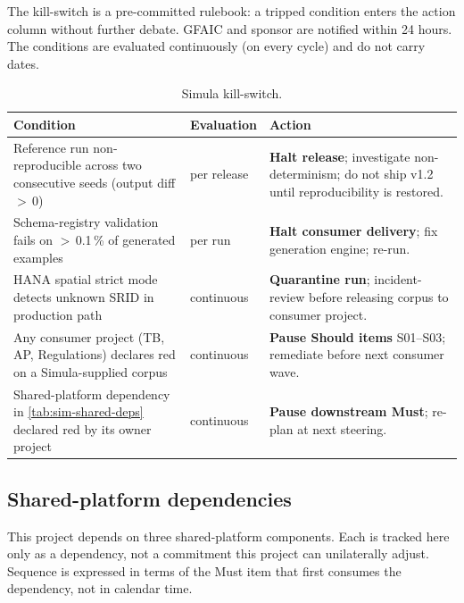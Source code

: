 The kill-switch is a pre-committed rulebook: a tripped condition enters
the action column without further debate. GFAIC and sponsor are
notified within 24 hours. The conditions are evaluated continuously
(on every cycle) and do not carry dates.

\begin{table}[htbp]
\centering
\caption{Simula kill-switch.}
\label{tab:sim-kill-switch}
\footnotesize
\begin{tabularx}{\linewidth}{@{}l l X@{}}
\toprule
\textbf{Condition} & \textbf{Evaluation} & \textbf{Action} \\ \midrule
Reference run non-reproducible across two consecutive seeds (output diff $>$\,0) & per release & \textbf{Halt release}; investigate non-determinism; do not ship v1.2 until reproducibility is restored. \\
Schema-registry validation fails on $>$\,0.1\,\% of generated examples & per run & \textbf{Halt consumer delivery}; fix generation engine; re-run. \\
HANA spatial strict mode detects unknown SRID in production path & continuous & \textbf{Quarantine run}; incident-review before releasing corpus to consumer project. \\
Any consumer project (TB, AP, Regulations) declares red on a Simula-supplied corpus & continuous & \textbf{Pause Should items} S01--S03; remediate before next consumer wave. \\
Shared-platform dependency in \cref{tab:sim-shared-deps} declared red by its owner project & continuous & \textbf{Pause downstream Must}; re-plan at next steering. \\
\bottomrule
\end{tabularx}
\end{table}

\subsection{Shared-platform dependencies}\label{sec:sim-shared-deps}

This project depends on three shared-platform components. Each is
tracked here only as a dependency, not a commitment this project can
unilaterally adjust. Sequence is expressed in terms of the Must item
that first consumes the dependency, not in calendar time.

